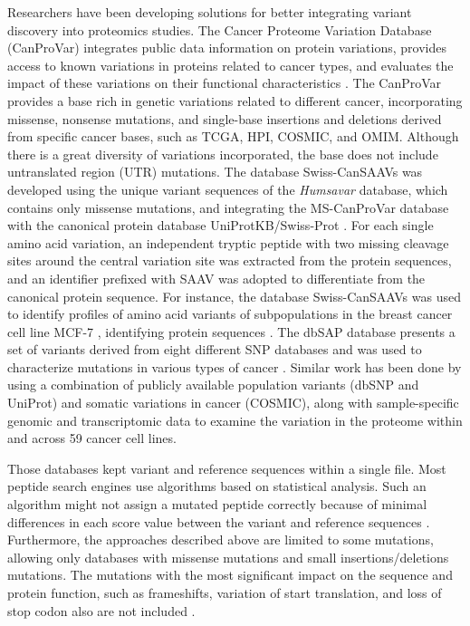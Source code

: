 \documentclass{ieeeaccess}
\begin{document}
Researchers have been developing solutions for better integrating variant discovery into proteomics studies. The Cancer Proteome Variation Database (CanProVar) integrates public data information on protein variations, provides access to known variations in proteins related to cancer types, and evaluates the impact of these variations on their functional characteristics \cite{Li2010-px,Zhang2017-yz}. The CanProVar provides a base rich in genetic variations related to different cancer, incorporating missense, nonsense mutations, and single-base insertions and deletions derived from specific cancer bases, such as TCGA, HPI, COSMIC, and OMIM. Although there is a great diversity of variations incorporated, the base does not include untranslated region (UTR) mutations. The database Swiss-CanSAAVs was developed using the unique variant sequences of the \textit{Humsavar} database, which contains only missense mutations, and integrating the MS-CanProVar database with the canonical protein database UniProtKB/Swiss-Prot  \cite{Song2014-bn}. For each single amino acid variation, an independent tryptic peptide with two missing cleavage sites around the central variation site was extracted from the protein sequences, and an identifier prefixed with SAAV was adopted to differentiate from the canonical protein sequence. For instance, the database Swiss-CanSAAVs was used to identify profiles of amino acid variants of subpopulations in the breast cancer cell line MCF-7 \cite{Tan2017-ut}, identifying protein sequences \cite{Song2014-bn}. The dbSAP database presents a set of variants derived from eight different SNP databases and was used to characterize mutations in various types of cancer \cite{Cao2017-pv}. Similar work has been done by \cite{Alfaro2017-vp} using a combination of publicly available population variants (dbSNP and UniProt) and somatic variations in cancer (COSMIC), along with sample-specific genomic and transcriptomic data to examine the variation in the proteome within and across 59 cancer cell lines. 

Those databases kept variant and reference sequences within a single file. Most peptide search engines use algorithms based on statistical analysis. Such an algorithm might not assign a mutated peptide correctly because of minimal differences in each score value between the variant and reference sequences \cite{Lane2005-nj}. Furthermore, the approaches described above are limited to some mutations, allowing only databases with missense mutations and small insertions/deletions mutations. The mutations with the most significant impact on the sequence and protein function, such as frameshifts, variation of start translation, and loss of stop codon also are not included \cite{Choi2012-jh,Hu2012-wm,Banfai2017-ql}. 
\end{document}
